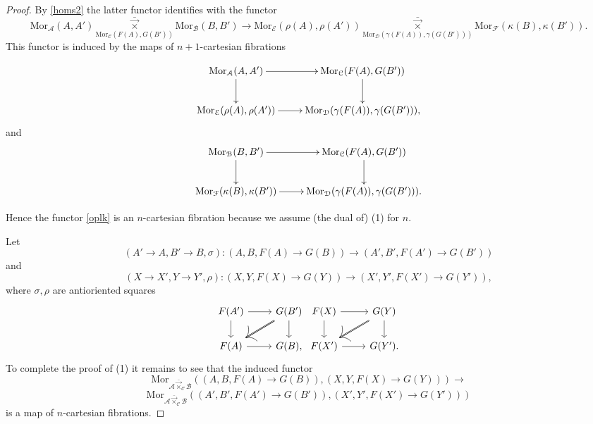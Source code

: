 \documentclass[10pt,oneside]{article}
\numberwithin{equation}{section} %
\numberwithin{figure}{section} %
\theoremstyle{plain}
\theoremstyle{definition}
\newcommand{\mA}{{\mathcal A}}
\newcommand{\mB}{{\mathcal B}}
\newcommand{\mC}{{\mathcal C}}
\newcommand{\mD}{{\mathcal D}}
\newcommand{\mE}{{\mathcal E}}
\newcommand{\mF}{{\mathcal F}}
\newcommand{\Mor}{{\mathrm{Mor}}}
\begin{document}
\begin{proof}
By \ref{homs2} the latter functor identifies with the functor 
\begin{equation}\label{oplk}
\Mor_\mA(A,A') \underset{\Mor_\mC(F(A),G(B'))}{{\bar{\vec{\times}}}} \Mor_\mB(B,B') \to \Mor_\mE(\rho(A),\rho(A')) \underset{{\Mor_\mD(\gamma(F(A)),\gamma(G(B')))}}{{\bar{\vec{\times}}}}\Mor_\mF(\kappa(B),\kappa(B')).\end{equation}
This functor is induced by the maps of $n+1$-cartesian fibrations

\begin{equation*}
\xymatrix{
\Mor_\mA(A,A') \ar[r] \ar[d] & \Mor_\mC(F(A),G(B')) \ar[d] \\
\Mor_\mE(\rho(A),\rho(A')) \ar[r] & \Mor_\mD(\gamma(F(A)),\gamma(G(B'))),
}
\end{equation*}
and
\begin{equation*}
\xymatrix{
\Mor_\mB(B,B') \ar[r] \ar[d] &\Mor_\mC(F(A),G(B')) \ar[d] \\
\Mor_\mF(\kappa(B),\kappa(B')) \ar[r] & \Mor_\mD(\gamma(F(A)),\gamma(G(B'))).
}
\end{equation*}

Hence the functor \ref{oplk} is an $n$-cartesian fibration because we assume (the dual of) (1) for $n.$

\vspace{1mm}



Let $$(A' \to A, B' \to B, \sigma) : (A, B, F(A) \to G(B)) \to (A', B', F(A') \to G(B'))$$
and $$(X \to X', Y \to Y', \rho)  : (X, Y, F(X) \to G(Y)) \to (X', Y', F(X') \to G(Y')), $$
where $\sigma, \rho$ are antioriented squares
\begin{equation*}
\begin{tikzcd}
F(A') \ar{r}{} \ar{d}[swap]{} & G(B') \ar[double]{dl}{} \ar{d}{} \\
F(A)  \ar{r}[swap]{} & G(B),
\end{tikzcd}
\begin{tikzcd}
F(X) \ar{r}{} \ar{d}[swap]{} & G(Y) \ar[double]{dl}{} \ar{d}{} \\
F(X')  \ar{r}[swap]{} & G(Y').
\end{tikzcd}
\end{equation*}
To complete the proof of (1) it remains to see that the induced functor $$ \Mor_{\mA {\bar{\vec{\times}}}_{\mC} \mB}((A, B, F(A) \to G(B)), (X, Y, F(X) \to G(Y))) \to $$$$ \Mor_{\mA {\bar{\vec{\times}}}_{\mC} \mB}((A', B', F(A') \to G(B')), (X', Y', F(X') \to G(Y'))) $$ is a map of $n$-cartesian fibrations.


\end{proof}
\end{document}
